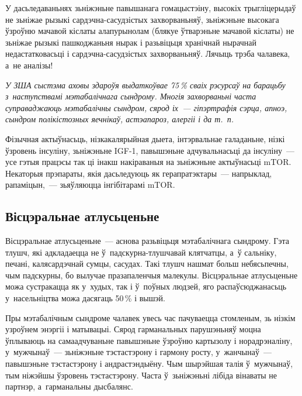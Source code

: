 У дасьледаваньнях зьніжэньне павышанага гомацыстэіну, высокіх трыгліцерыдаў не зьніжае рызыкі сардэчна-сасудзістых захворваньняў, зьніжэньне высокага ўзроўню мачавой кіслаты алапурынолам (блякуе ўтварэньне мачавой кіслаты) не зьніжае рызыкі пашкоджаньня нырак і разьвіцьця хранічнай нырачнай недастатковасьці і сардэчна-сасудзістых захворваньняў. Лячыць трэба чалавека, а~не аналізы!

\emph{У ЗША сыстэма аховы здароўя выдаткоўвае 75\,\% сваіх рэсурсаў на барацьбу з~наступствамі мэтабалічнага сындрому. Многія захворваньні часта суправаджаюць мэтабалічны сындром, сярод іх~--- гіпэртрафія сэрца, апноэ, сындром полікістозных яечнікаў, астэапароз, алергіі і да т.~п.}

Фізычная актыўнасьць, нізкакалярыйная дыета, інтэрвальнае галаданьне, нізкі ўзровень інсуліну, зьніжэньне IGF-1, павышэньне адчувальнасьці да інсуліну~--- усе гэтыя працэсы так ці інакш накіраваныя на зьніжэньне актыўнасьці mTOR. Некаторыя прэпараты, якія дасьледуюць як герапратэктары~--- напрыклад, рапаміцын,~--- зьяўляюцца інгібітарамі mTOR.

\subsection*{Вісцэральнае атлусьценьне}

Вісцэральнае атлусьценьне~--- аснова разьвіцьця мэтабалічнага сындрому. Гэта тлушч, які адкладаецца не ў~падскурна-тлушчавай клятчатцы, а~ў сальніку, печані, калясардэчнай сумцы, сасудах. Такі тлушч нашмат больш небясьпечны, чым падскурны, бо вылучае празапаленчыя малекулы. Вісцэральнае атлусьценьне можа сустракацца як у~худых, так і ў~поўных людзей, яго распаўсюджанасьць у~насельніцтва можа дасягаць 50\,\% і вышэй.

Пры мэтабалічным сындроме чалавек увесь час пачуваецца стомленым, зь нізкім узроўнем энэргіі і матывацыі. Сярод гарманальных парушэньняў моцна ўплываюць на самаадчуваньне павышэньне ўзроўню картызолу і норадрэналіну, у~мужчынаў~--- зьніжэньне тэстастэрону і гармону росту, у~жанчынаў~--- павышэньне тэстастэрону і андрастэндыёну. Чым шырэйшая талія ў~мужчынаў, тым ніжэйшы ўзровень тэстастэрону. Часта ў~зьніжэньні лібіда вінаваты не партнэр, а~гарманальны дысбалянс.


